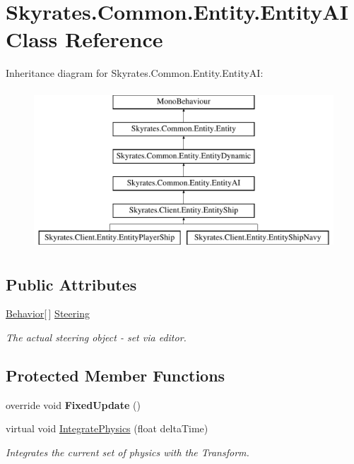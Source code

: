\hypertarget{class_skyrates_1_1_common_1_1_entity_1_1_entity_a_i}{\section{Skyrates.\-Common.\-Entity.\-Entity\-A\-I Class Reference}
\label{class_skyrates_1_1_common_1_1_entity_1_1_entity_a_i}
}
Inheritance diagram for Skyrates.\-Common.\-Entity.\-Entity\-A\-I\-:\begin{figure}[H]
\begin{center}
\leavevmode
\includegraphics[height=6.000000cm]{class_skyrates_1_1_common_1_1_entity_1_1_entity_a_i}
\end{center}
\end{figure}
\subsection*{Public Attributes}
\begin{DoxyCompactItemize}
\item 
\hyperlink{class_skyrates_1_1_common_1_1_a_i_1_1_behavior}{Behavior}\mbox{[}$\,$\mbox{]} \hyperlink{class_skyrates_1_1_common_1_1_entity_1_1_entity_a_i_acaf6cab23f49e38b527dcdd293c14b22}{Steering}
\begin{DoxyCompactList}\small\item\em The actual steering object -\/ set via editor. \end{DoxyCompactList}\end{DoxyCompactItemize}
\subsection*{Protected Member Functions}
\begin{DoxyCompactItemize}
\item 
\hypertarget{class_skyrates_1_1_common_1_1_entity_1_1_entity_a_i_a8bfb96bb82a51c8e8c82318c2093adce}{override void {\bfseries Fixed\-Update} ()}\label{class_skyrates_1_1_common_1_1_entity_1_1_entity_a_i_a8bfb96bb82a51c8e8c82318c2093adce}

\item 
virtual void \hyperlink{class_skyrates_1_1_common_1_1_entity_1_1_entity_a_i_afbe72fb71f59895af6d50618a49aee09}{Integrate\-Physics} (float delta\-Time)
\begin{DoxyCompactList}\small\item\em Integrates the current set of physics with the Transform. \end{DoxyCompactList}\end{DoxyCompactItemize}
